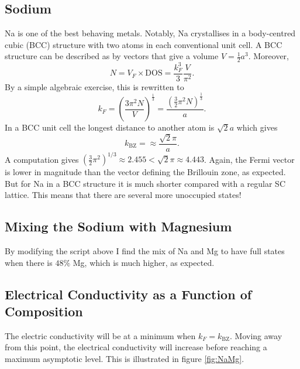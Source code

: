 \documentclass[11pt]{amsart}
\begin{document}
\subsection{Sodium}
Na is one of the best behaving metals. Notably, Na crystallises in a body-centred cubic (BCC) structure with two atoms in each conventional unit cell. A BCC structure can be described as by vectors that give a volume $V=\frac{1}{2}a^3$. Moreover,
\begin{equation}
N = V_F \times \text{DOS} = \frac{k_F^3}{3}\frac{V}{\pi^2}.
\end{equation}
By a simple algebraic exercise, this is rewritten to
\begin{equation}
k_F = \left(\frac{3\pi^2N}{V} \right)^{\frac{1}{3}} = \frac{(\frac{3}{2}\pi^2N)^\frac{1}{3}}{a}.
\end{equation}
In a BCC unit cell the longest distance to another atom is $\sqrt{2}a$ which gives
\begin{equation}
k_\text{BZ} = \approx \frac{\sqrt{2}\pi}{a}.
\end{equation}
A computation gives $(\frac{3}{2}\pi^2)^{1/3} \approx 2.455 < \sqrt{2}\pi \approx 4.443$. Again, the Fermi vector is lower in magnitude than the vector defining the Brillouin zone, as expected. But for Na in a BCC structure it is much shorter compared with a regular SC lattice. This means that there are several more unoccupied states!

\subsection{Mixing the Sodium with Magnesium}
By modifying the script above I find the mix of Na and Mg to have full states when there is $48\%$ Mg, which is much higher, as expected.

\subsection{Electrical Conductivity as a Function of Composition}
The electric conductivity will be at a minimum when $k_F = k_\text{BZ}$. Moving away from this point, the electrical conductivity will increase before reaching a maximum asymptotic level. This is illustrated in figure \ref{fig:NaMg}.
\end{document}
